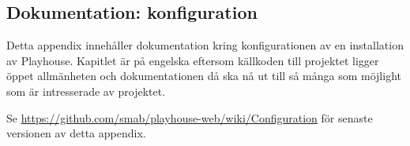 \documentclass[a4paper,11pt]{article}
\begin{document}
\begin{appendices}




\newpage
\section{Dokumentation: konfiguration}
  Detta appendix innehåller dokumentation kring konfigurationen av en
  installation av Playhouse.  Kapitlet är på engelska eftersom källkoden till
  projektet ligger öppet allmänheten och dokumentationen då ska nå ut till så
  många som möjlight som är intresserade av projektet.

  Se \url{https://github.com/smab/playhouse-web/wiki/Configuration} för
  senaste versionen av detta appendix.


\end{appendices}
\end{document}

